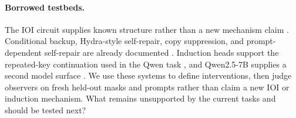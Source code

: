 \paragraph{Borrowed testbeds.}
The IOI circuit supplies known structure rather than a new mechanism claim
\cite{wang2023ioi}. Conditional backup, Hydra-style self-repair, copy
suppression, and prompt-dependent self-repair are already documented
\cite{mcgrath2023hydra,mcdougall2023copy,rushing2024selfrepair}. Induction heads
support the repeated-key continuation used in the Qwen task
\cite{olsson2022induction}, and Qwen2.5-7B supplies a second model surface
\cite{qwen2024qwen25}. We use these systems to define interventions, then judge
observers on fresh held-out masks and prompts rather than claim a new IOI or
induction mechanism. What remains unsupported by the current tasks and should
be tested next?
